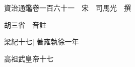 






























































資治通鑑卷一百六十一　宋　司馬光　撰

胡三省　音註

梁紀十七|{
	著雍執徐一年}


高祖武皇帝十七

